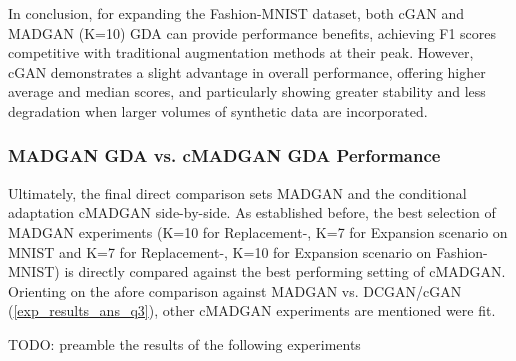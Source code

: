 In conclusion, for expanding the Fashion-MNIST dataset, both cGAN and MADGAN (K=10) GDA can provide performance benefits, achieving F1 scores competitive with traditional augmentation methods at their peak. However, cGAN demonstrates a slight advantage in overall performance, offering higher average and median scores, and particularly showing greater stability and less degradation when larger volumes of synthetic data are incorporated.

\newpage
\subsubsection[Question 4]{MADGAN GDA vs. cMADGAN GDA Performance}      \label{exp_results_ans_q4}
Ultimately, the final direct comparison sets MADGAN and the conditional adaptation cMADGAN side-by-side. As established before, the best selection of MADGAN experiments (K=10 for Replacement-, K=7 for Expansion scenario on MNIST and K=7 for Replacement-, K=10 for Expansion scenario on Fashion-MNIST) is directly compared against the best performing setting of cMADGAN. Orienting on the afore comparison against MADGAN vs. DCGAN/cGAN (\ref{exp_results_ans_q3}), other cMADGAN experiments are mentioned were fit.

TODO: preamble the results of the following experiments

\newpage

